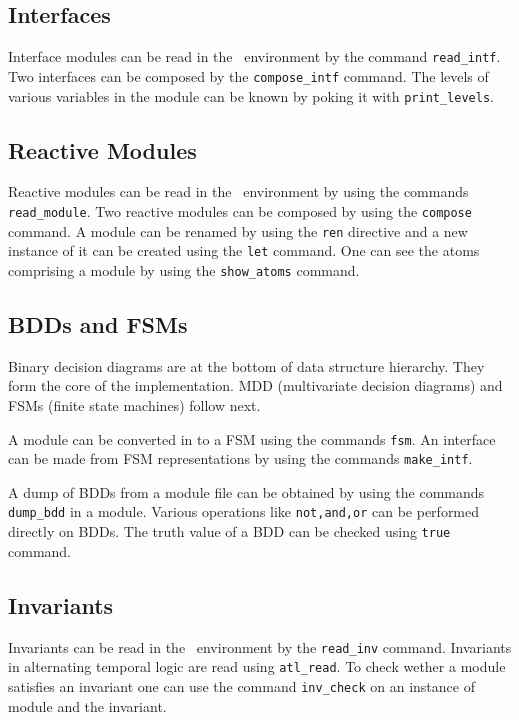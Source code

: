 \subsection{ Interfaces}
Interface modules can be read in the \chai \ environment by the
command \texttt{read\_intf}. Two interfaces can be composed by the
\texttt{compose\_intf} command. The levels of various variables in
the module can be known by poking it with \texttt{print\_levels}.

\subsection{Reactive Modules}
Reactive modules can be read in the \chai \ environment by using
the commands \texttt{read\_module}. Two reactive modules can be
composed by using the \texttt{compose} command. A module can be
renamed by using the \texttt{ren} directive and a new instance of
it can be created using the \texttt{let} command. One can see the
atoms comprising a module by using the \texttt{show\_atoms}
command.

\subsection{BDDs and  FSMs}
 Binary decision diagrams are at the bottom of data
structure hierarchy. They form the core of the implementation. MDD
(multivariate decision diagrams) and FSMs (finite state machines)
follow next.

A module can be converted in to a FSM using the commands
\texttt{fsm}. An interface can be made from FSM representations by
using the commands \texttt{make\_intf}.

A dump of BDDs from a module file can be obtained by using the
commands \texttt{dump\_bdd} in a module. Various operations like
\texttt{not,and,or} can be performed directly on BDDs. The truth
value of a BDD can be checked using \texttt{true} command.

\subsection{Invariants}
Invariants can be read in the \chai \ environment by the
\texttt{read\_inv} command. Invariants in alternating temporal
logic are read using \texttt{atl\_read}. To check wether a module
satisfies an invariant one can use the command \texttt{inv\_check}
on an instance of module and the invariant.

